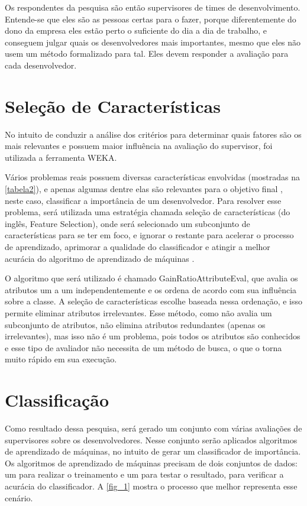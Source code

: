 Os respondentes da pesquisa são então supervisores de times de desenvolvimento. Entende-se que eles são as pessoas certas para o fazer, porque diferentemente do dono da empresa eles estão perto o suficiente do dia a dia de trabalho, e conseguem julgar quais os desenvolvedores mais importantes, mesmo que eles não usem um método formalizado para tal. Eles devem responder a avaliação para cada desenvolvedor.

\section{Seleção de Características}\label{secao3.3}

No intuito de conduzir a análise dos critérios para determinar quais fatores são os mais relevantes e possuem maior influência na avaliação do supervisor, foi utilizada a ferramenta WEKA\cite{Holmes}.

Vários problemas reais possuem diversas características envolvidas (mostradas na \autoref{tabela2}), e apenas algumas dentre elas são relevantes para o objetivo final \cite{Kira1992}, neste caso, classificar a importância de um desenvolvedor. Para resolver esse problema, será utilizada uma estratégia chamada seleção de características (do inglês, Feature Selection), onde será selecionado um subconjunto de características para se ter em foco, e ignorar o restante para acelerar o processo de aprendizado, aprimorar a qualidade do classificador e atingir a melhor acurácia do algoritmo de aprendizado de máquinas \cite{Kira1992,Kohavi1997}. 

O algoritmo que será utilizado é chamado GainRatioAttributeEval, que avalia os atributos um a um independentemente e os ordena de acordo com sua influência sobre a classe. A seleção de características escolhe baseada nessa ordenação, e isso permite eliminar atributos irrelevantes. Esse método, como não avalia um subconjunto de atributos, não elimina atributos redundantes (apenas os irrelevantes), mas isso não é um problema, pois todos os atributos são conhecidos e esse tipo de avaliador não necessita de um método de busca, o que o torna muito rápido em sua execução.

\section{Classificação}\label{secao3.4}

Como resultado dessa pesquisa, será gerado um conjunto com várias avaliações de supervisores sobre os desenvolvedores. Nesse conjunto serão aplicados algoritmos de aprendizado de máquinas, no intuito de gerar um classificador de importância. Os algoritmos de aprendizado de máquinas precisam de dois conjuntos de dados: um para realizar o treinamento e um para testar o resultado, para verificar a acurácia do classificador. A \autoref{fig_1} mostra o processo que melhor representa esse cenário.

